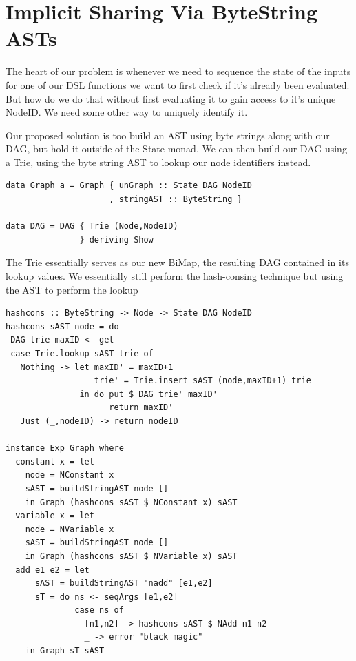 \documentclass[runningheads]{llncs}
\begin{document}
\section{Implicit Sharing Via ByteString ASTs}

The heart of our problem is whenever we need to sequence the state of the inputs
for one of our DSL functions we want to first check if it's already been
evaluated. But how do we do that without first evaluating it to gain access to
it's unique NodeID. We need some other way to uniquely identify it.

Our proposed solution is too build an AST using byte strings along with our
DAG, but hold it outside of the State monad. We can then build our DAG using a
Trie, using the byte string AST to lookup our node identifiers instead.

\begin{verbatim}
data Graph a = Graph { unGraph :: State DAG NodeID
                     , stringAST :: ByteString }

data DAG = DAG { Trie (Node,NodeID)
               } deriving Show
\end{verbatim}

The Trie essentially serves as our new BiMap, the resulting DAG contained in its
lookup values. We essentially still perform the hash-consing technique but using
the AST to perform the lookup
\begin{verbatim}
hashcons :: ByteString -> Node -> State DAG NodeID
hashcons sAST node = do
 DAG trie maxID <- get
 case Trie.lookup sAST trie of
   Nothing -> let maxID' = maxID+1
                  trie' = Trie.insert sAST (node,maxID+1) trie
               in do put $ DAG trie' maxID'
                     return maxID'
   Just (_,nodeID) -> return nodeID

instance Exp Graph where
  constant x = let
    node = NConstant x
    sAST = buildStringAST node []
    in Graph (hashcons sAST $ NConstant x) sAST
  variable x = let
    node = NVariable x
    sAST = buildStringAST node []
    in Graph (hashcons sAST $ NVariable x) sAST
  add e1 e2 = let
      sAST = buildStringAST "nadd" [e1,e2]
      sT = do ns <- seqArgs [e1,e2]
              case ns of
                [n1,n2] -> hashcons sAST $ NAdd n1 n2
                _ -> error "black magic"
    in Graph sT sAST

\end{verbatim}
\end{document}
